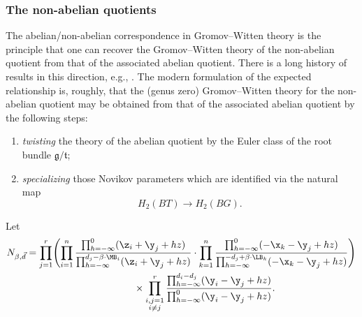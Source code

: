 \subsubsection{The non-abelian quotients}
The abelian/non-abelian correspondence in Gromov--Witten theory is the principle that one can recover the Gromov--Witten theory of the non-abelian quotient from that of the associated abelian quotient. There is a long history of results in this direction, e.g., \cite{BCK, BCK2, CKS, CLS, Web, Web2}. The modern formulation of the expected relationship is, roughly, that the (genus zero) Gromov--Witten theory for the non-abelian quotient may be obtained from that of the associated abelian quotient by the following steps:
\begin{enumerate}\itemsep=0pt
\item[1)] \emph{twisting} the theory of the abelian quotient by the Euler class of the root bundle $\mathfrak g/\mathfrak t$;
\item[2)] \emph{specializing} those Novikov parameters which are identified via the natural map
\[
H_2(BT) \to H_2(BG).
\]
\end{enumerate}
Let
\begin{gather}%
 N_{\beta,\vec{d}}=
	 \prod_{j=1}^r\Biggl(\prod_{i=1}^n \frac{\prod_{h=-\infty}^0 (\z_i+\y_j+hz)}{\prod_{h=-\infty}^{d_j-\beta\cdot \MB_i} (\z_i+\y_j+hz)}
	\cdot \prod_{k=1}^{n}\frac{\prod_{h=-\infty}^{0}(-\x_k -\y_j+hz)}{\prod_{h=-\infty}^{-d_j+\beta\cdot \LB_k}(-\x_k -\y_j+hz)}\Biggr) \nonumber \\
	\hphantom{ N_{\beta,\vec{d}}=\prod_{j=1}^r}{}
 \times \prod_{\substack{i,j=1\\ i\neq j}}^r
	\frac{\prod_{h=-\infty}^{d_i-d_j}(\y_i-\y_j+hz)}{\prod_{h=-\infty}^{0}(\y_i-\y_j+hz)} .\label{Nbeta}
	\end{gather}

